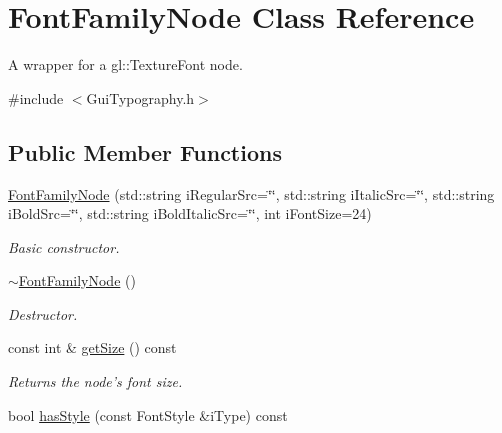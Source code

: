 \hypertarget{class_font_family_node}{\section{Font\-Family\-Node Class Reference}
\label{class_font_family_node}
}


A wrapper for a gl\-::\-Texture\-Font node.  




{\ttfamily \#include $<$Gui\-Typography.\-h$>$}

\subsection*{Public Member Functions}
\begin{DoxyCompactItemize}
\item 
\hypertarget{class_font_family_node_a1abc0902a131ff9a15c87fd1f62b3cbc}{\hyperlink{class_font_family_node_a1abc0902a131ff9a15c87fd1f62b3cbc}{Font\-Family\-Node} (std\-::string i\-Regular\-Src=\char`\"{}\char`\"{}, std\-::string i\-Italic\-Src=\char`\"{}\char`\"{}, std\-::string i\-Bold\-Src=\char`\"{}\char`\"{}, std\-::string i\-Bold\-Italic\-Src=\char`\"{}\char`\"{}, int i\-Font\-Size=24)}\label{class_font_family_node_a1abc0902a131ff9a15c87fd1f62b3cbc}

\begin{DoxyCompactList}\small\item\em Basic constructor. \end{DoxyCompactList}\item 
\hypertarget{class_font_family_node_a0a52a5a08a194f4c99da43efb9eca2d0}{\hyperlink{class_font_family_node_a0a52a5a08a194f4c99da43efb9eca2d0}{$\sim$\-Font\-Family\-Node} ()}\label{class_font_family_node_a0a52a5a08a194f4c99da43efb9eca2d0}

\begin{DoxyCompactList}\small\item\em Destructor. \end{DoxyCompactList}\item 
\hypertarget{class_font_family_node_a1e4d86332c5f1e5d5473fcc2b6fc162a}{const int \& \hyperlink{class_font_family_node_a1e4d86332c5f1e5d5473fcc2b6fc162a}{get\-Size} () const }\label{class_font_family_node_a1e4d86332c5f1e5d5473fcc2b6fc162a}

\begin{DoxyCompactList}\small\item\em Returns the node's font size. \end{DoxyCompactList}\item 
\hypertarget{class_font_family_node_a1bbf41d96e2bc35b7076d7ed6850bb07}{bool \hyperlink{class_font_family_node_a1bbf41d96e2bc35b7076d7ed6850bb07}{has\-Style} (const Font\-Style \&i\-Type) const }\label{class_font_family_node_a1bbf41d96e2bc35b7076d7ed6850bb07}


\end{DoxyCompactItemize}
